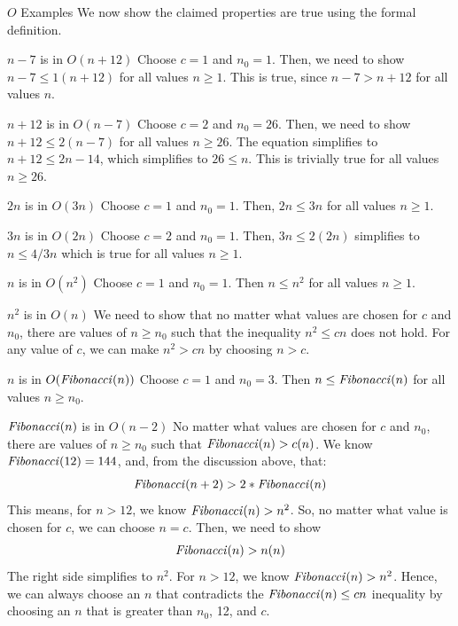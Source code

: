 \begin{schemeregion}
\begin{examplenobar}{$O$ Examples} We now show the claimed properties are true using the formal definition.  
\begin{descriptionlist}
\item[$n-7$ is in $O(n+12)$] \forcenl Choose $c = 1$ and $n_0 = 1$.  Then, we need to show $n-7 \le 1(n+12)$ for all values $n \ge 1$.  This is true, since $n-7 > n+12$ for all values $n$.  
\item[$n+12$ is in $O(n-7)$] \forcenl Choose $c = 2$ and $n_0 = 26$.  Then, we need to show $n+12 \le 2(n-7)$ for all values $n \ge 26$.  The equation simplifies to $n + 12 \le 2n - 14$, which simplifies to $26 \le n$.  This is trivially true for all values $n \ge 26$.
\item[$2n$ is in $O(3n)$]\forcenl Choose $c = 1$ and $n_0 = 1$.  Then, $2n \le 3n$ for all values $n \ge 1$.
\item[$3n$ is in $O(2n)$]\forcenl Choose $c = 2$ and $n_0 = 1$.  Then, $3n \le 2(2n)$ simplifies to $n \le 4/3 n$ which is true for all values $n \ge 1$.
\item[$n$ is in $O(n^2)$]\forcenl Choose $c = 1$ and $n_0 = 1$.  Then $n \le n^2$ for all values $n \ge 1$.
\item[$n^2$ is \bold{not} in $O(n)$]\forcenl We need to show that no matter what values are chosen for $c$ and $n_0$, there are values of $n \ge n_0$ such that the inequality $n^2 \le cn$ does not hold.  For any value of $c$, we can make $n^2 > cn$ by choosing $n>c$.
\item[$n$ is in $O(\textrm{\emph{Fibonacci}}(n))$]\forcenl Choose $c = 1$ and $n_0 = 3$.  Then $n \le \textrm{\emph{Fibonacci}}(n)$ for all values $n \ge n_0$.
\item[$\textrm{\emph{Fibonacci}}(n)$ is \bold{not} in $O(n-2)$]\forcenl No matter what values are chosen for $c$ and $n_0$, there are values of $n \ge n_0$ such that $\textrm{\emph{Fibonacci}}(n) > c(n)$.  We know $\textrm{\emph{Fibonacci}}(12)=144$, and, from the discussion above, that:
\begin{displaymath}
\textrm{\emph{Fibonacci}}(n+2) > 2 * \textrm{\emph{Fibonacci}}(n)
\end{displaymath}
This means, for $n>12$, we know $\textrm{\emph{Fibonacci}}(n)>n^2$.  So, no matter what value is chosen for $c$, we can choose $n=c$.  Then, we need to show 
\begin{displaymath}
\textrm{\emph{Fibonacci}}(n) > n(n)
\end{displaymath}
The right side simplifies to $n^2$.  For $n>12$, we know $\textrm{\emph{Fibonacci}}(n) > n^2$.  Hence, we can always choose an $n$ that contradicts the $\textrm{\emph{Fibonacci}}(n) \le cn$ inequality by choosing an $n$ that is greater than $n_0$, 12, and $c$.
\end{descriptionlist}
\end{examplenobar}


\end{schemeregion}
